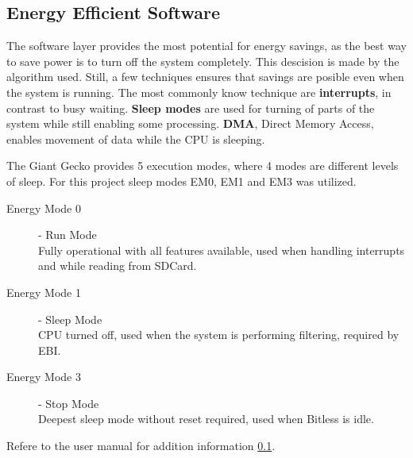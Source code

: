 \subsection{Energy Efficient Software}

The software layer provides the most potential for energy savings, as the best
way to save power is to turn off the system completely. This descision is made
by the algorithm used. Still, a few techniques ensures that savings are posible even when the system 
is running. The most commonly know technique are {\bf interrupts}, in contrast to busy 
waiting. {\bf Sleep modes} are used for turning of parts of the system while still enabling 
some processing. {\bf DMA}, Direct Memory Access, enables movement of data while the
CPU is sleeping. 

The Giant Gecko provides 5 execution modes, where 4 modes are different levels of sleep. 
For this project sleep modes EM0, EM1 and EM3 was utilized.


\begin{description}
	\item[Energy Mode 0] - Run Mode \hfill \\
		Fully operational with all features available, used when handling interrupts and while reading from SDCard.
	\item[Energy Mode 1] - Sleep Mode \hfill \\
		CPU turned off, used when the system is performing filtering, required by EBI.
	\item[Energy Mode 3] - Stop Mode \hfill \\
		Deepest sleep mode without reset required, used when Bitless is idle.
\end{description}
Refere to the user manual for addition information \ref{}.
